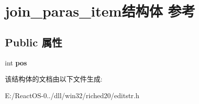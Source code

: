 \hypertarget{structjoin__paras__item}{}\section{join\+\_\+paras\+\_\+item结构体 参考}
\label{structjoin__paras__item}
\subsection*{Public 属性}
\begin{DoxyCompactItemize}
\item 
\mbox{\label{structjoin__paras__item_a8748f2676ec8241f4f5d4fba723c0593}} 
int {\bfseries pos}
\end{DoxyCompactItemize}


该结构体的文档由以下文件生成\+:\begin{DoxyCompactItemize}
\item 
E\+:/\+React\+O\+S-\/0../dll/win32/riched20/editstr.\+h\end{DoxyCompactItemize}
